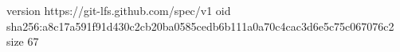 version https://git-lfs.github.com/spec/v1
oid sha256:a8c17a591f91d430c2cb20ba0585cedb6b111a0a70c4cac3d6e5c75c067076c2
size 67
